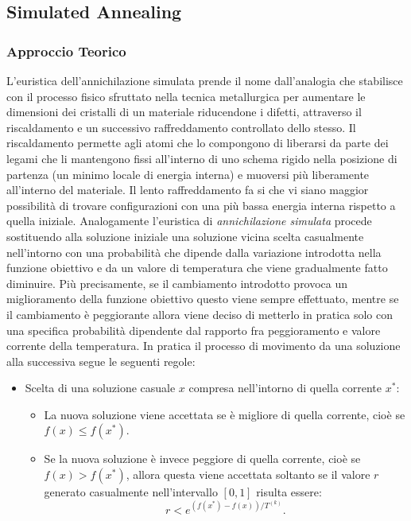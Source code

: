 \documentclass[a4paper,10pt]{article}
\begin{document}
\subsection{Simulated Annealing}
\subsubsection{Approccio Teorico}
L'euristica dell'annichilazione simulata prende il nome dall'analogia che stabilisce con il processo fisico sfruttato nella tecnica metallurgica per aumentare le dimensioni dei cristalli di un materiale riducendone i difetti, attraverso il riscaldamento e un successivo raffreddamento controllato dello stesso. Il riscaldamento permette agli atomi che lo compongono di liberarsi da parte dei legami che li mantengono fissi all'interno di uno schema rigido nella posizione di partenza (un minimo locale di energia interna) e muoversi più liberamente all'interno del materiale. Il lento raffreddamento fa si che vi siano maggior possibilità di trovare configurazioni con una più bassa energia interna rispetto a quella iniziale.
Analogamente l'euristica di \emph{annichilazione simulata} procede sostituendo alla soluzione iniziale una soluzione vicina scelta casualmente nell'intorno con una probabilità che dipende dalla variazione introdotta nella funzione obiettivo e da un valore di temperatura che viene gradualmente fatto diminuire. Più precisamente, se il cambiamento introdotto provoca un miglioramento della funzione obiettivo questo viene sempre effettuato, mentre se il cambiamento è peggiorante allora viene deciso di metterlo in pratica solo con una specifica probabilità dipendente dal rapporto fra peggioramento e valore corrente della temperatura. In pratica il processo di movimento da una soluzione alla successiva segue le seguenti regole:

\begin{itemize}
 \item Scelta di una soluzione casuale $x$ compresa nell'intorno di quella corrente $x^{*}$:
\begin{itemize}
 \item La nuova soluzione viene accettata se è migliore di quella corrente, cioè se $f(x)\leq f(x^{*})$.
 \item Se la nuova soluzione è invece peggiore di quella corrente, cioè se $f(x)>f(x^{*})$, allora questa viene accettata soltanto se il valore $r$ generato casualmente nell'intervallo $[0,1]$ risulta essere:
\begin{displaymath}
 r<e^{(f(x^{*})-f(x))/T^{(k)}}\textrm{.}
\end{displaymath}
\end{itemize}
\end{itemize}
\end{document}
